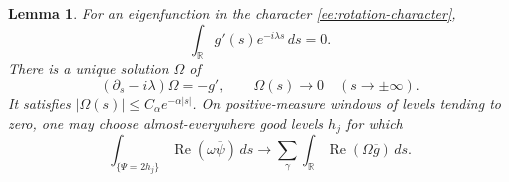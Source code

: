 \documentclass[reqno,11pt]{amsart}
\numberwithin{equation}{section}
\newtheorem{lemma}[theorem]{Lemma}
\theoremstyle{remark}
\begin{document}
\begin{lemma}\label{ee:canonical-transport}
For an eigenfunction in the character \eqref{ee:rotation-character},
\begin{equation}\label{ee:melnikov}
 \int_{\mathbb R}g'(s)e^{-i\lambda s}\,ds=0.
\end{equation}
There is a unique solution $\Omega$ of
\begin{equation}\label{ee:canonical-ode}
 (\partial_s-i\lambda)\Omega=-g',\qquad
 \Omega(s)\longrightarrow0\quad(s\longrightarrow\pm\infty).
\end{equation}
It satisfies $|\Omega(s)|\le C_\alpha e^{-\alpha|s|}$.
On positive-measure windows of levels tending to zero, one may
choose almost-everywhere good levels $h_j$ for which
\begin{equation}\label{ee:pairing-limit}
 \int_{\{\Psi=2h_j\}}\operatorname{Re}(\omega\overline\psi)\,ds
 \longrightarrow
 \sum_\gamma\int_{\mathbb R}
                         \operatorname{Re}(\Omega\overline g)\,ds.
\end{equation}
\end{lemma}
\end{document}
